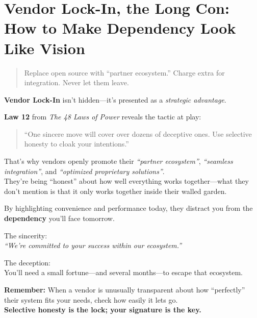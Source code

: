 \section{Vendor Lock-In, the Long Con: How to Make Dependency Look Like Vision}

\begin{quote}
Replace open source with “partner ecosystem.” Charge extra for integration. Never let them leave.
\end{quote}

  \textbf{Vendor Lock-In} isn’t hidden—it’s presented as a \textit{strategic advantage}.
  
  \medskip
  
  \textbf{Law 12} from \textit{The 48 Laws of Power} reveals the tactic at play:
  \begin{quote}
  ``One sincere move will cover over dozens of deceptive ones. Use selective honesty to cloak your intentions.''
  \end{quote}
  
  \medskip
  
  That’s why vendors openly promote their \textit{``partner ecosystem''}, \textit{``seamless integration''}, and \textit{``optimized proprietary solutions''}. \\
  They’re being ``honest'' about how well everything works together—what they don’t mention is that it only works together inside their walled garden.
  
  \medskip
  
  By highlighting convenience and performance today, they distract you from the \textbf{dependency} you’ll face tomorrow.
  
  \medskip
  
  The sincerity: \\
  \textit{``We’re committed to your success within our ecosystem.''}
  
  \medskip
  
  The deception: \\
  You’ll need a small fortune—and several months—to escape that ecosystem.
  
  \medskip
  
  \textbf{Remember:} When a vendor is unusually transparent about how ``perfectly'' their system fits your needs, check how easily it lets go. \\
  \textbf{Selective honesty is the lock; your signature is the key.}
  
  

